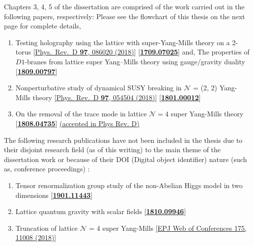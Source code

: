 \vspace*{2em}

\noindent Chapters 3, 4, 5 of the dissertation are comprised of the work carried out in the following papers, respectively:
Please see the flowchart of this thesis on the next page for complete details, 

\begin{enumerate}

\item Testing holography using the lattice with super-Yang-Mills theory on a 2-torus [\href{https://journals.aps.org/prd/abstract/10.1103/PhysRevD.97.086020}{Phys.\ Rev.\ D {\bf 97}, 086020 (2018)}] [\textbf{\textcolor{blue}{\href{https://arxiv.org/abs/1709.07025}{1709.07025}}}]   and,  The properties of $D1$-branes from lattice super Yang--Mills theory using gauge/gravity duality   [\textbf{\textcolor{blue}{\href{https://arxiv.org/abs/1809.00797}{1809.00797}}}] 
 \item Nonperturbative study of dynamical SUSY breaking in $\mathcal{N}$ = (2, 2) Yang-Mills theory  [\href{https://journals.aps.org/prd/abstract/10.1103/PhysRevD.97.054504}{Phys.\ Rev.\ D {\bf 97}, 054504 (2018)}] [\textbf{\textcolor{blue}{\href{https://arxiv.org/abs/1801.00012}{1801.00012}}}]   
   \item On the removal of the trace mode in lattice $\mathcal{N }= 4$ super Yang-Mills theory  [\textbf{\textcolor{blue}{\href{https://arxiv.org/abs/1808.04735}{1808.04735}}}] \href{https://journals.aps.org/prd/accepted/8d072Q69Ide18d24f2c61259a36a4536c02c700b5}{(accepted in Phys Rev. D)}

\end{enumerate}


\vspace{10mm} 


\noindent The following research publications have not been included in the thesis due to their disjoint research field (as of this writing) to the main theme of the dissertation work or 
because of their DOI (Digital object identifier) nature (such as, conference proceedings) :

\begin{enumerate}
\item Tensor renormalization group study of the non-Abelian Higgs model in two dimensions [\textbf{\textcolor{blue}{\href{https://arxiv.org/abs/1901.11443}{1901.11443}}}]  
 \item  Lattice quantum gravity with scalar fields [\textbf{\textcolor{blue}{\href{https://arxiv.org/abs/1810.09946}{1810.09946}}}]
  \item Truncation of lattice $\mathcal{N}$ = 4 super Yang-Mills [\href{https://doi.org/10.1051/epjconf/201817511008}{EPJ Web of Conferences 175, 11008 (2018)}]
   \end{enumerate}


